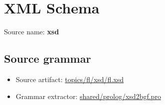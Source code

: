 \chapter{XML Schema}

 Source name: \textbf{xsd}

\section{Source grammar}

\begin{itemize}\item Source artifact: \href{http://github.com/grammarware/slps/blob/master/topics/fl/xsd/fl.xsd}{topics/fl/xsd/fl.xsd}\item Grammar extractor: \href{http://github.com/grammarware/slps/blob/master/shared/prolog/xsd2bgf.pro}{shared/prolog/xsd2bgf.pro}\end{itemize}

